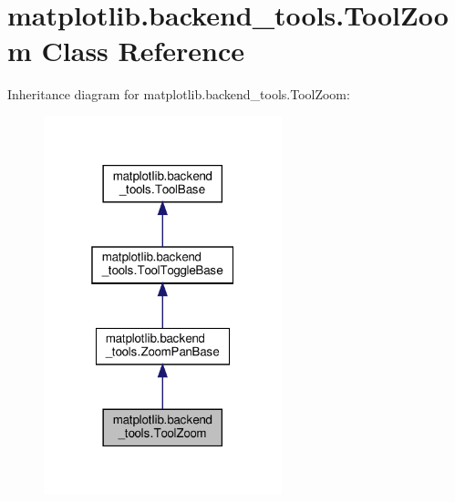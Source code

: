 \hypertarget{classmatplotlib_1_1backend__tools_1_1ToolZoom}{}\section{matplotlib.\+backend\+\_\+tools.\+Tool\+Zoom Class Reference}
\label{classmatplotlib_1_1backend__tools_1_1ToolZoom}


Inheritance diagram for matplotlib.\+backend\+\_\+tools.\+Tool\+Zoom\+:
\nopagebreak
\begin{figure}[H]
\begin{center}
\leavevmode
\includegraphics[width=196pt]{classmatplotlib_1_1backend__tools_1_1ToolZoom__inherit__graph}
\end{center}
\end{figure}



